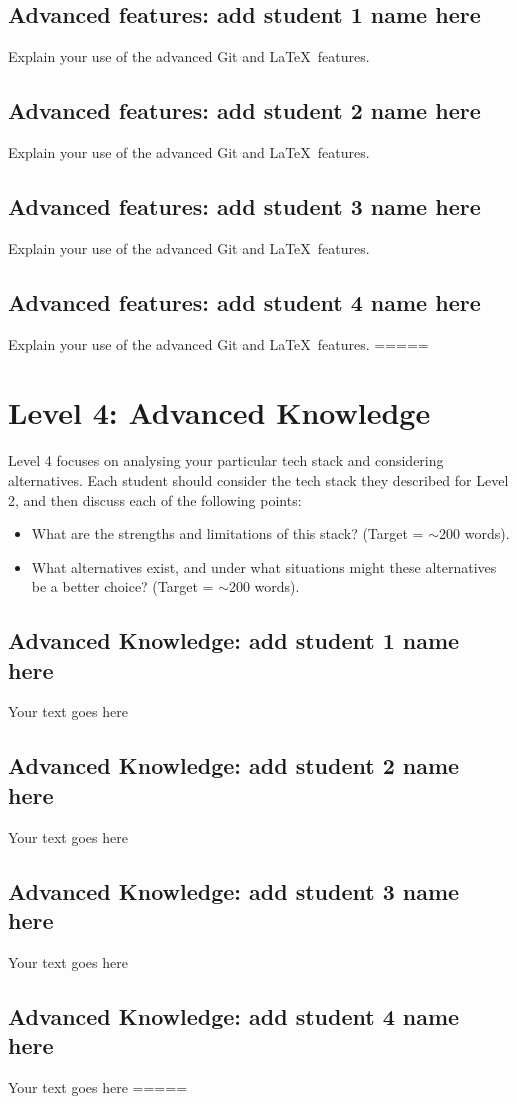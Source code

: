 \documentclass[a4paper, 11pt]{report}
\begin{document}
	\subsection{Advanced features: add student 1 name here}
	Explain your use of the advanced Git and \LaTeX\ features. 
	\subsection{Advanced features: add student 2 name here}
	Explain your use of the advanced Git and \LaTeX\ features. 
	\subsection{Advanced features: add student 3 name here}
	Explain your use of the advanced Git and \LaTeX\ features. 
	\subsection{Advanced features: add student 4 name here}
	Explain your use of the advanced Git and \LaTeX\ features. 
	=====
	\newpage
	\section{Level 4: Advanced Knowledge}
	Level 4 focuses on analysing your particular tech stack and considering 
	alternatives. Each student should consider the tech stack they described for Level 
	2, and then discuss each of the following points:
	\begin{itemize}
		\item What are the strengths and limitations of this stack? (Target = $\sim$200
		words).
		\item What alternatives exist, and under what situations might these 
		alternatives be a better choice? (Target = $\sim$200 words).
	\end{itemize}
	\subsection{Advanced Knowledge: add student 1 name here}
	Your text goes here
	\subsection{Advanced Knowledge: add student 2 name here}
	Your text goes here
	\subsection{Advanced Knowledge: add student 3 name here}
	Your text goes here
	\subsection{Advanced Knowledge: add student 4 name here}
	Your text goes here 
	=====

	
\end{document}
